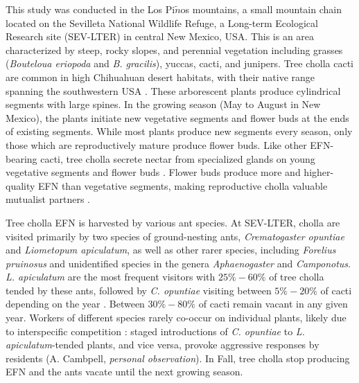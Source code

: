 \documentclass[11pt]{article}
\begin{document}
This study was conducted in the Los Pi$\tilde{n}$os mountains, a small mountain chain located on the Sevilleta National Wildlife Refuge, a Long-term Ecological Research site (SEV-LTER) in central New Mexico, USA.
This is an area characterized by steep, rocky slopes, and perennial vegetation including grasses (\textit{Bouteloua eriopoda} and \textit{B. gracilis}), yuccas, cacti, and junipers. 
Tree cholla cacti are common in high Chihuahuan desert habitats, with their native range spanning the southwestern USA \citep{Benson1982}. 
These arborescent plants produce cylindrical segments with large spines. 
In the growing season (May to August in New Mexico), the plants initiate new vegetative segments and flower buds at the ends of existing segments. 
While most plants produce new segments every season, only those which are reproductively mature produce flower buds. 
Like other EFN-bearing cacti, tree cholla secrete nectar from specialized glands on young vegetative segments and flower buds \citep{Ness2006,Oliveira1999}. 
Flower buds produce more and higher-quality EFN than vegetative segments, making reproductive cholla valuable mutualist partners \citep{Miller2014}. 

Tree cholla EFN is harvested by various ant species. 
At SEV-LTER, cholla are visited primarily by two species of ground-nesting ants, \textit{Crematogaster opuntiae} and \textit{Liometopum apiculatum}, as well as other rarer species, including \textit{Forelius pruinosus} and unidentified species in the genera \textit{Aphaenogaster} and \textit{Camponotus}.
\textit{L. apiculatum} are the most frequent visitors with $25\% - 60\%$ of tree cholla tended by these ants, followed by \textit{C. opuntiae} visiting between $5\% - 20\%$ of cacti depending on the year \citep{Donald2022}. 
Between $ 30\% - 80\%$ of cacti remain vacant in any given year. 
Workers of different species rarely co-occur on individual plants, likely due to interspecific competition \citep{Miller2007}: staged introductions of \textit{C. opuntiae} to \textit{L. apiculatum}-tended plants, and vice versa, provoke aggressive responses by residents (A. Cambpell, \textit{personal observation}).
In Fall, tree cholla stop producing EFN and the ants vacate until the next growing season. 
\end{document}
